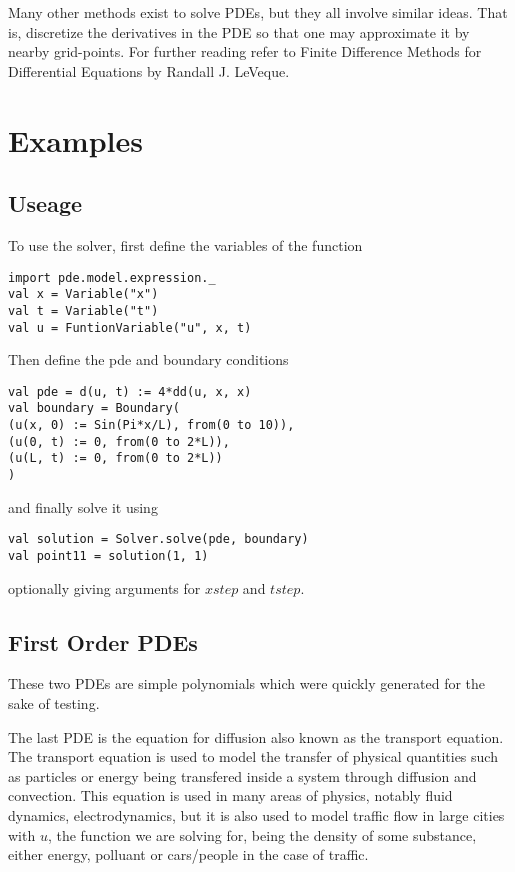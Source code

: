 Many other methods exist to solve PDEs, but they all involve similar
ideas. That is, discretize the derivatives in the PDE so that one may
approximate it by nearby grid-points. For further reading refer to Finite Difference Methods for
Differential Equations by Randall J. LeVeque\cite{leveque}.
\section{Examples}
\subsection{Useage}
To use the solver, first define the variables of the function
\begin{verbatim}
import pde.model.expression._
val x = Variable("x")
val t = Variable("t")
val u = FuntionVariable("u", x, t)
\end{verbatim}
Then define the pde and boundary conditions
\begin{verbatim}
val pde = d(u, t) := 4*dd(u, x, x)
val boundary = Boundary(
(u(x, 0) := Sin(Pi*x/L), from(0 to 10)),
(u(0, t) := 0, from(0 to 2*L)),
(u(L, t) := 0, from(0 to 2*L))
)
\end{verbatim}
and finally solve it using
\begin{verbatim}
val solution = Solver.solve(pde, boundary)
val point11 = solution(1, 1)
\end{verbatim}
optionally giving arguments for $xstep$ and $tstep$.
\subsection{First Order PDEs}
These two PDEs are simple polynomials which were quickly generated for
the sake of testing.

The last PDE is the equation for diffusion also
known as the transport equation. The transport equation is used to
model the transfer of physical quantities such as particles or energy
being transfered inside a system through diffusion and
convection. This equation is used in many areas of physics, notably
fluid dynamics, electrodynamics, but it is also used to model traffic
flow in large cities with $u$, the function we are solving for, being
the density of some substance, either energy, polluant or cars/people
in the case of traffic.

